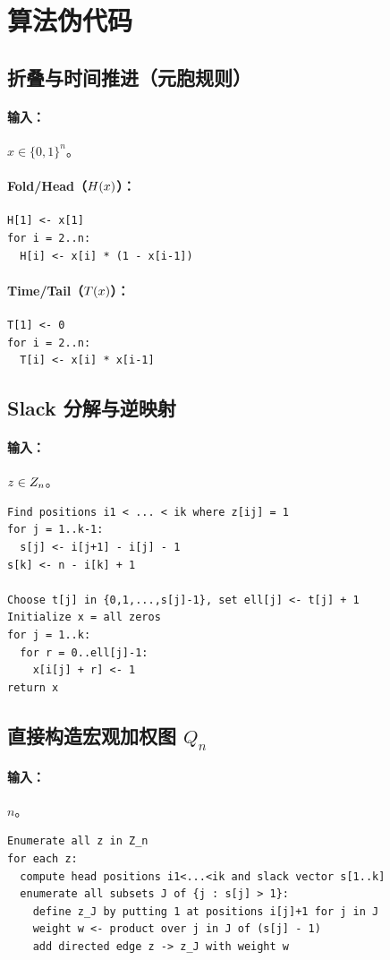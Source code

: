 
\section{算法伪代码}

\subsection{折叠与时间推进（元胞规则）}

\paragraph{输入：} $x\in\{0,1\}^n$。

\paragraph{Fold/Head（$H(x)$）：}
\begin{verbatim}
H[1] <- x[1]
for i = 2..n:
  H[i] <- x[i] * (1 - x[i-1])
\end{verbatim}

\paragraph{Time/Tail（$T(x)$）：}
\begin{verbatim}
T[1] <- 0
for i = 2..n:
  T[i] <- x[i] * x[i-1]
\end{verbatim}

\subsection{Slack 分解与逆映射}

\paragraph{输入：} $z\in Z_n$。
\begin{verbatim}
Find positions i1 < ... < ik where z[ij] = 1
for j = 1..k-1:
  s[j] <- i[j+1] - i[j] - 1
s[k] <- n - i[k] + 1

Choose t[j] in {0,1,...,s[j]-1}, set ell[j] <- t[j] + 1
Initialize x = all zeros
for j = 1..k:
  for r = 0..ell[j]-1:
    x[i[j] + r] <- 1
return x
\end{verbatim}

\subsection{直接构造宏观加权图 $Q_n$}

\paragraph{输入：} $n$。
\begin{verbatim}
Enumerate all z in Z_n
for each z:
  compute head positions i1<...<ik and slack vector s[1..k]
  enumerate all subsets J of {j : s[j] > 1}:
    define z_J by putting 1 at positions i[j]+1 for j in J
    weight w <- product over j in J of (s[j] - 1)
    add directed edge z -> z_J with weight w
\end{verbatim}

